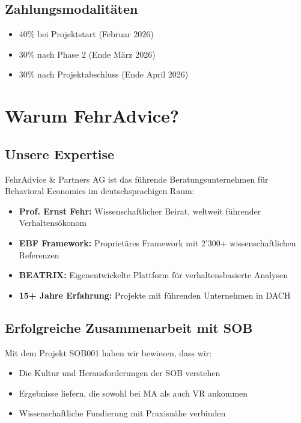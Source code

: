 \documentclass{fehradvice-report}
\begin{document}
\subsection{Zahlungsmodalitäten}

\begin{itemize}
    \item 40\% bei Projektstart (Februar 2026)
    \item 30\% nach Phase 2 (Ende März 2026)
    \item 30\% nach Projektabschluss (Ende April 2026)
\end{itemize}

\newpage
\section{Warum FehrAdvice?}

\subsection{Unsere Expertise}

FehrAdvice \& Partners AG ist das führende Beratungsunternehmen für Behavioral Economics im deutschsprachigen Raum:

\begin{itemize}
    \item \textbf{Prof. Ernst Fehr:} Wissenschaftlicher Beirat, weltweit führender Verhaltensökonom
    \item \textbf{EBF Framework:} Proprietäres Framework mit 2'300+ wissenschaftlichen Referenzen
    \item \textbf{BEATRIX:} Eigenentwickelte Plattform für verhaltensbasierte Analysen
    \item \textbf{15+ Jahre Erfahrung:} Projekte mit führenden Unternehmen in DACH
\end{itemize}

\subsection{Erfolgreiche Zusammenarbeit mit SOB}

Mit dem Projekt SOB001 haben wir bewiesen, dass wir:

\begin{itemize}
    \item Die Kultur und Herausforderungen der SOB verstehen
    \item Ergebnisse liefern, die sowohl bei MA als auch VR ankommen
    \item Wissenschaftliche Fundierung mit Praxisnähe verbinden
\end{itemize}
\end{document}
